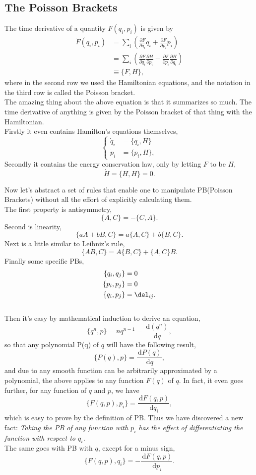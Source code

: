 \documentclass{article}
\newcommand{\be}{\begin{equation}}
\newcommand{\ee}{\end{equation}}
\newcommand{\bs}{\be\begin{split}}
\newcommand{\dif}{\,\mathrm{d}}
\newcommand{\p}{\partial}
\newcommand{\1}{\left}
\newcommand{\2}{\right}
\begin{document}
\subsection{The Poisson Brackets}
The time derivative of a quantity $F(q_i, p_i)$ is given by
\bs
\dot F(q_i, p_i)&=\sum_i \1(\frac{\p F}{\p q_i} \dot q_i+\frac{\p F}{\p p_i} \dot p_i\2)\\
&=\sum_i \1(\frac{\p F}{\p q_i} \frac{\p H}{\p p_i}-\frac{\p F}{\p p_i} \frac{\p H}{\p q_i}\2)\\
&\equiv \{F,H\},
\end{split}\ee
where in the second row we used the Hamiltonian equations, and the notation in the third row is called the Poisson bracket.\\

The amazing thing about the above equation is that it summarizes so much. The time derivative of anything is given by the Poisson bracket of that thing with the Hamiltonian.\\
Firstly it even contains Hamilton's equations themselves,
\be\1\{\begin{split}
\dot q_i&=\{q_i,H\}\\
\dot p_i&=\{p_i,H\},
\end{split}\2.\ee
Secondly it contains the energy conservation law, only by letting $F$ to be $H$,
\be
\dot H=\{H,H\}=0.
\ee

Now let's abstract a set of rules that enable one to manipulate PB(Poisson Brackets) without all the effort of explicitly calculating them.\\
The first property is antisymmetry,
\be
\{A,C\}=-\{C,A\}.
\ee
Second is linearity,
\be
\{aA+bB,C\}=a\{A,C\}+b\{B,C\}.
\ee
Next is a little similar to Leibniz's rule,
\be
\{AB,C\}=A\{B,C\}+\{A,C\}B.
\ee
Finally some specific PBs,
\bs
\{q_i,q_j\}&=0\\
\{p_i,p_j\}&=0\\
\{q_i,p_j\}&=\del_{ij}.
\end{split}\ee\\

Then it's easy by mathematical induction to derive an equation,
\be
\{q^n,p\}=nq^{n-1}=\frac{\dif (q^n)}{\dif q},
\ee
so that any polynomial P(q) of $q$ will have the following result,
\be
\{P(q),p\}=\frac{\dif P(q)}{\dif q},
\ee
and due to any smooth function can be arbitrarily approximated by a polynomial, the above applies to any function $F(q)$ of $q$. In fact, it even goes further, for any function of $q$ and $p$, we have
\be
\{F(q,p),p_i\}=\frac{\dif F(q,p)}{\dif q_i},
\ee
which is easy to prove by the definition of PB. Thus we have discovered a new fact: \textit{Taking the PB of any function with $p_i$ has the effect of differentiating the function with respect to $q_i$.}\\
The same goes with PB with $q$, except for a minus sign,
\be
\{F(q,p),q_i\}=-\frac{\dif F(q,p)}{\dif p_i}.
\ee
\end{document}
